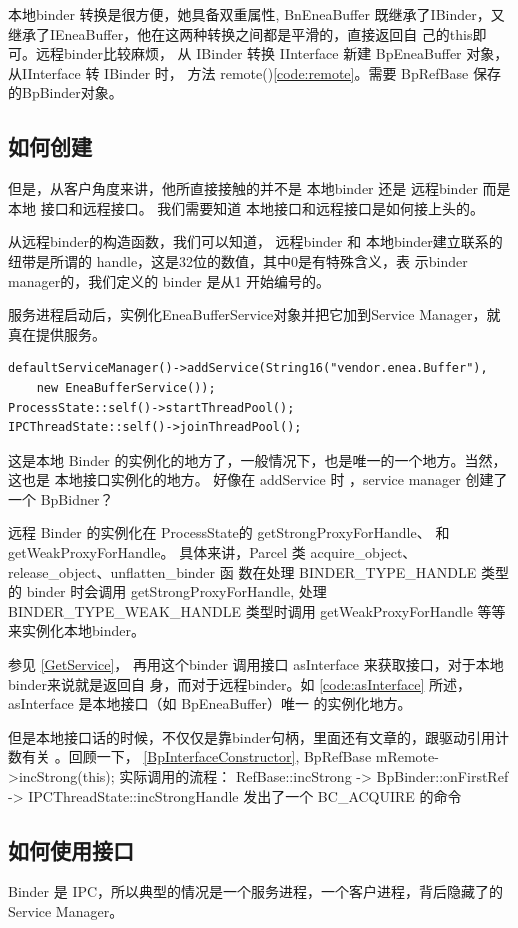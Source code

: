 \documentclass[a4paper,11pt]{article}
\begin{document}
本地binder 转换是很方便，她具备双重属性, BnEneaBuffer
既继承了IBinder，又继承了IEneaBuffer，他在这两种转换之间都是平滑的，直接返回自
己的this即可。远程binder比较麻烦， 从 IBinder 转换
IInterface 新建 BpEneaBuffer 对象，从IInterface 转 IBinder 时， 方法
remote()\ref{code:remote}。需要 BpRefBase
保存的BpBinder对象。
 
\subsection{如何创建}
但是，从客户角度来讲，他所直接接触的并不是 本地binder 还是 远程binder
而是本地 接口和远程接口。 我们需要知道 本地接口和远程接口是如何接上头的。

从远程binder的构造函数，我们可以知道， 远程binder 和
本地binder建立联系的纽带是所谓的 handle，这是32位的数值，其中0是有特殊含义，表
示binder manager的，我们定义的 binder 是从1 开始编号的。

服务进程启动后，实例化EneaBufferService对象并把它加到Service Manager，就真在提供服务。 
\begin{lstlisting}[label={addservice}]
defaultServiceManager()->addService(String16("vendor.enea.Buffer"),
    new EneaBufferService());
ProcessState::self()->startThreadPool();
IPCThreadState::self()->joinThreadPool();
\end{lstlisting}
这是本地 Binder 的实例化的地方了，一般情况下，也是唯一的一个地方。当然，这也是
本地接口实例化的地方。
好像在 addService 时 ，service manager 创建了一个 BpBidner？

远程 Binder 的实例化在 ProcessState的 getStrongProxyForHandle\label{code:getStrongProxyForHandle}、
和 getWeakProxyForHandle。
具体来讲，Parcel 类 acquire_object、release_object、unflatten_binder 函
数在处理 BINDER_TYPE_HANDLE 类型的 binder 时会调用
getStrongProxyForHandle, 处理 BINDER_TYPE_WEAK_HANDLE 类型时调用
getWeakProxyForHandle 等等来实例化本地binder。

参见 \ref{GetService}， 再用这个binder 调用接口 asInterface 来获取接口，对于本地binder来说就是返回自
 身，而对于远程binder。如 \ref{code:asInterface} 所述，asInterface 是本地接口（如 BpEneaBuffer）唯一
的实例化地方。  


但是本地接口话的时候，不仅仅是靠binder句柄，里面还有文章的，跟驱动引用计数有关
。回顾一下， \ref{BpInterfaceConstructor},
BpRefBase   mRemote->incStrong(this); 实际调用的流程：
RefBase::incStrong -> BpBinder::onFirstRef -> IPCThreadState::incStrongHandle
发出了一个 BC_ACQUIRE 的命令

\subsection{如何使用接口}
Binder 是 IPC，所以典型的情况是一个服务进程，一个客户进程，背后隐藏了的Service Manager。
\end{document}
